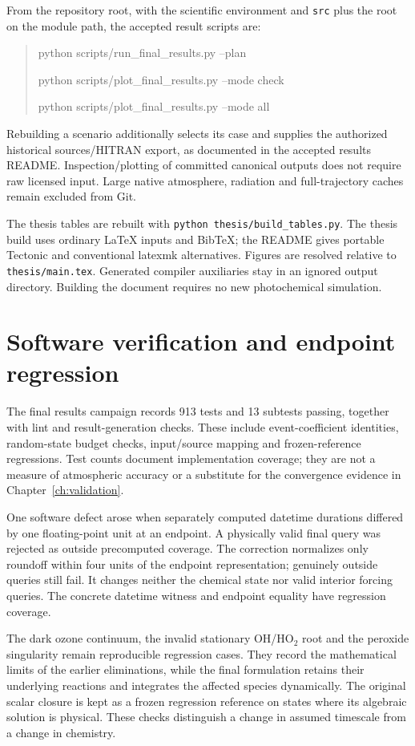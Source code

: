 From the repository root, with the scientific environment and \texttt{src} plus the root on the module path, the accepted result scripts are:
\begin{quote}\small\ttfamily
python scripts/run\_final\_results.py --plan\par
python scripts/plot\_final\_results.py --mode check\par
python scripts/plot\_final\_results.py --mode all
\end{quote}
Rebuilding a scenario additionally selects its case and supplies the authorized historical sources/HITRAN export, as documented in the accepted results README. Inspection/plotting of committed canonical outputs does not require raw licensed input. Large native atmosphere, radiation and full-trajectory caches remain excluded from Git.

The thesis tables are rebuilt with \texttt{python thesis/build\_tables.py}. The thesis build uses ordinary LaTeX inputs and BibTeX; the README gives portable Tectonic and conventional latexmk alternatives. Figures are resolved relative to \texttt{thesis/main.tex}. Generated compiler auxiliaries stay in an ignored output directory. Building the document requires no new photochemical simulation.

\section{Software verification and endpoint regression}
The final results campaign records 913 tests and 13 subtests passing, together with lint and result-generation checks. These include event-coefficient identities, random-state budget checks, input/source mapping and frozen-reference regressions. Test counts document implementation coverage; they are not a measure of atmospheric accuracy or a substitute for the convergence evidence in Chapter~\ref{ch:validation}.

One software defect arose when separately computed datetime durations differed by one floating-point unit at an endpoint. A physically valid final query was rejected as outside precomputed coverage. The correction normalizes only roundoff within four units of the endpoint representation; genuinely outside queries still fail. It changes neither the chemical state nor valid interior forcing queries. The concrete datetime witness and endpoint equality have regression coverage.

The dark ozone continuum, the invalid stationary OH/HO$_2$ root and the peroxide singularity remain reproducible regression cases. They record the mathematical limits of the earlier eliminations, while the final formulation retains their underlying reactions and integrates the affected species dynamically. The original scalar closure is kept as a frozen regression reference on states where its algebraic solution is physical. These checks distinguish a change in assumed timescale from a change in chemistry.

